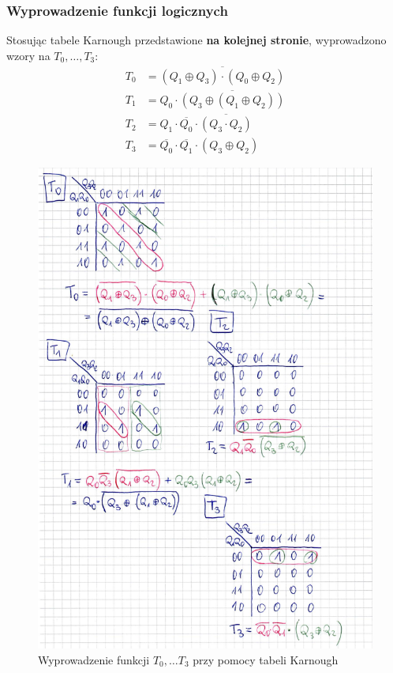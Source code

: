 \documentclass[12pt,a4paper,table]{article}
\begin{document}
    \subsubsection{Wyprowadzenie funkcji logicznych}
    Stosując tabele Karnough przedstawione \textbf{na kolejnej stronie}, wyprowadzono wzory na $T_0, \dots, T_3$:
    \begin{align*}
        T_0 &= \overline{(Q_1 \oplus Q_3) \cdot (Q_0 \oplus Q_2)} \\
        T_1 &= Q_0 \cdot \overline{(Q_3 \oplus (Q_1 \oplus Q_2))} \\
        T_2 &= Q_1 \cdot \overline{Q_0} \cdot \overline{(Q_3 \cdot Q_2)} \\
        T_3 &= \overline{Q_0} \cdot \overline{Q_1} \cdot (Q_3 \oplus Q_2)
    \end{align*}
    

    \begin{figure}[hp]
        \centering
        \includegraphics[width=\linewidth]{images/gray_wyprowadzenie.PNG}
        \caption{Wyprowadzenie funkcji $T_0, \dots T_3$ przy pomocy tabeli Karnough}
    \end{figure}
\end{document}
